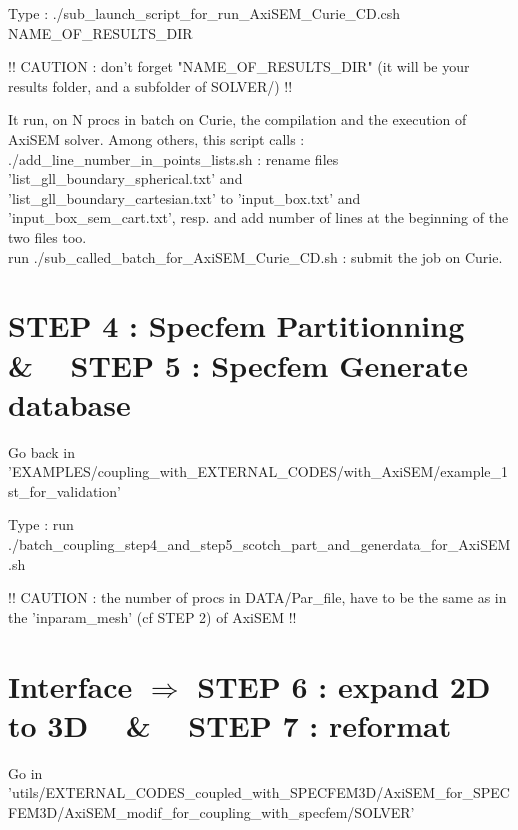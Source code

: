 \documentclass[11pt]{article}
\begin{document}
\medskip

\noindent Type : ./sub\_launch\_script\_for\_run\_AxiSEM\_Curie\_CD.csh NAME\_OF\_RESULTS\_DIR

\smallskip

\noindent !! CAUTION : don't forget "NAME\_OF\_RESULTS\_DIR" (it will be your results folder, and a subfolder of SOLVER/) !!

\smallskip

\noindent It run, on N procs in batch on Curie, the compilation and the execution of  AxiSEM solver.
Among others, this script calls : \\

\noindent ./add\_line\_number\_in\_points\_lists.sh : rename files 'list\_gll\_boundary\_spherical.txt' and \\ 'list\_gll\_boundary\_cartesian.txt' to 'input\_box.txt' and 'input\_box\_sem\_cart.txt', resp. and add number of lines at the beginning of the two files too. \\

\noindent run ./sub\_called\_batch\_for\_AxiSEM\_Curie\_CD.sh : submit the job on Curie.


\section{STEP 4 : Specfem Partitionning ~ \& ~ STEP 5 : Specfem Generate database}

\noindent Go back in 'EXAMPLES/coupling\_with\_EXTERNAL\_CODES/with\_AxiSEM/example\_1st\_for\_validation'

\medskip

\noindent Type : run ./batch\_coupling\_step4\_and\_step5\_scotch\_part\_and\_generdata\_for\_AxiSEM.sh

\medskip

\noindent !! CAUTION : the number of procs in DATA/Par\_file, have to be the same as in the 'inparam\_mesh' (cf STEP 2) of AxiSEM !!


\section{Interface $\Longrightarrow$ STEP 6 : expand 2D to 3D ~ \& ~ STEP 7 : reformat}

\noindent Go in {\scriptsize 'utils/EXTERNAL\_CODES\_coupled\_with\_SPECFEM3D/AxiSEM\_for\_SPECFEM3D/AxiSEM\_modif\_for\_coupling\_with\_specfem/SOLVER'}

\medskip
\end{document}
